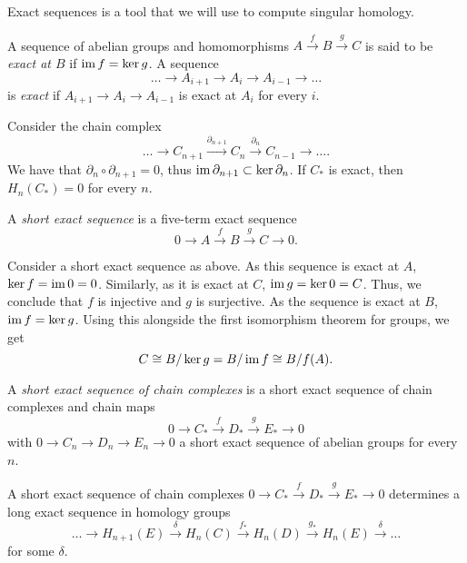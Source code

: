 Exact sequences is a tool that we will use to compute singular homology.

\begin{definition}
	A sequence of abelian groups and homomorphisms $A \xrightarrow f B \xrightarrow g C$ is said to be \emph{exact at $B$} if $\operatorname{im} f = \ker g$. A sequence
	\[\ldots \to A_{i+1} \to A_i \to A_{i-1} \to \ldots\]
	is \emph{exact} if $A_{i+1} \to A_i \to A_{i-1}$ is exact at $A_i$ for every $i$.
\end{definition}

Consider the chain complex
\[
	\ldots \to C_{n+1} \xrightarrow{\partial_{n+1}} C_n \xrightarrow{\partial_{n}} C_{n-1} \to \ldots.
\]
We have that $\partial_n \circ \partial_{n+1} = 0$, thus $\operatorname{im} \partial_{n+1} \subset \ker \partial_n$. If $C_*$ is exact, then $H_n(C_*) = 0$ for every $n$.

\begin{definition}
	A \emph{short exact sequence} is a five-term exact sequence
	\[0 \to A \xrightarrow f B \xrightarrow g C \to 0.\]
\end{definition}

Consider a short exact sequence as above. As this sequence is exact at $A$, $\ker f = \operatorname{im} 0 = 0$. Similarly, as it is exact at $C$, $\operatorname{im} g = \ker 0 = C$. Thus, we conclude that $f$ is injective and $g$ is surjective. As the sequence is exact at $B$, $\operatorname{im} f = \ker g$. Using this alongside the first isomorphism theorem for groups, we get
\[C \cong B/\ker g = B / \operatorname{im} f \cong B / f(A).\]

\begin{definition}
	A \emph{short exact sequence of chain complexes} is a short exact sequence of chain complexes and chain maps
	\[0 \to C_* \xrightarrow f D_* \xrightarrow g E_* \to 0\]
	with $0 \to C_n \to D_n \to E_n \to 0$ a short exact sequence of abelian groups for every $n$.
\end{definition}

\begin{theorem}
	A short exact sequence of chain complexes $0 \to C_* \xrightarrow f D_* \xrightarrow g E_* \to 0$ determines a long exact sequence in homology groups
	\[\ldots \to H_{n+1}(E) \xrightarrow{\delta} H_n(C) \xrightarrow{f_*} H_n(D) \xrightarrow{g_*} H_n(E) \xrightarrow{\delta} \ldots\]
	for some $\delta$.
\end{theorem}


